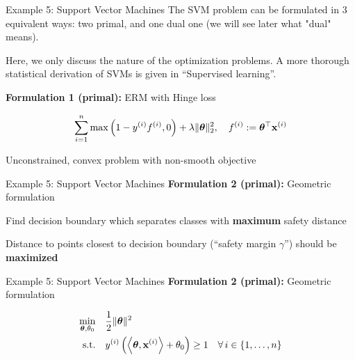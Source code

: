 \documentclass[11pt,compress,t,notes=noshow, xcolor=table]{beamer}
\begin{document}
\begin{frame2}{Example 5: Support Vector Machines}
The SVM problem can be formulated in $3$ equivalent ways: two primal, and one dual one (we will see later what "dual" means).

\begin{footnotesize}
Here, we only discuss the nature of the optimization problems. A more thorough statistical derivation of SVMs is given in ``Supervised learning''.
\end{footnotesize}

\spacer

\textbf{Formulation 1 (primal): } ERM with Hinge loss

$$
\sum\limits_{i=1}^n \max\left(1 - y^{(i)} f^{(i)}, 0\right) + \lambda \|\bm{\theta}\|_2^2, \quad f^{(i)} := \bm{\theta}^\top \mathbf{x}^{(i)}
$$

\vfill

\begin{footnotesize}
Unconstrained, convex problem with non-smooth objective
\end{footnotesize}
\end{frame2}

\begin{frame2}{Example 5: Support Vector Machines}
\textbf{Formulation 2 (primal): } Geometric formulation

\begin{itemizeL}
\item Find decision boundary which separates classes with \textbf{maximum} safety distance
\item Distance to points closest to decision boundary (\enquote{safety margin $\gamma$}) should be \textbf{maximized}
\end{itemizeL}

\vfill

\end{frame2}

\begin{frame2}{Example 5: Support Vector Machines}
\textbf{Formulation 2 (primal): } Geometric formulation

$$
\begin{aligned}
\min\limits_{\bm{\theta}, \theta_0} \quad & \frac{1}{2} \|\bm{\theta}\|^2 \\
\text{s.t.} \quad & y^{(i)}  \left( \left\langle \bm{\theta}, \mathbf{x}^{(i)} \right\rangle + \theta_0 \right) \ge 1 \quad \forall\, i \in \{1, \ldots, n\}
\end{aligned}
$$

\end{frame2}
\end{document}
